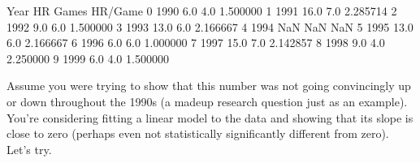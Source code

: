 \documentclass[letterpaper,10pt,english]{sphinxmanual}
\begin{document}
\begin{sphinxVerbatim}[commandchars=\\\{\}]
   Year    HR  \PYGZsh{}Games   HR/Game
0  1990   6.0     4.0  1.500000
1  1991  16.0     7.0  2.285714
2  1992   9.0     6.0  1.500000
3  1993  13.0     6.0  2.166667
4  1994   NaN     NaN       NaN
5  1995  13.0     6.0  2.166667
6  1996   6.0     6.0  1.000000
7  1997  15.0     7.0  2.142857
8  1998   9.0     4.0  2.250000
9  1999   6.0     4.0  1.500000
\end{sphinxVerbatim}

\begin{sphinxVerbatim}[commandchars=\\\{\}]
   
 \PYG{p}{[}\PYG{p}{]} \PYG{p}{[}\PYG{p}{]} 
  
 \PYG{p}{[}\PYG{p}{]} 
  
  
   
\end{sphinxVerbatim}

\noindent{}

Assume you were trying to show that this number was not going convincingly up or down throughout the 1990s (a made\sphinxhyphen{}up research question just as an example).  You’re considering fitting a linear model to the data and showing that its slope is close to zero (perhaps even not statistically significantly different from zero).  Let’s try.

\begin{sphinxVerbatim}[commandchars=\\\{\}]
   
 \PYG{p}{[}\PYG{p}{]} \PYG{p}{[}\PYG{p}{]} 
\end{sphinxVerbatim}
\end{document}
